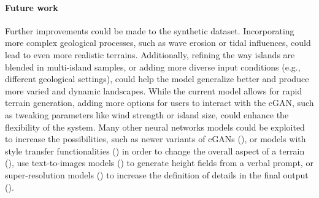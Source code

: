 \paragraph{Future work}
Further improvements could be made to the synthetic dataset. Incorporating more complex geological processes, such as wave erosion or tidal influences, could lead to even more realistic terrains. Additionally, refining the way islands are blended in multi-island samples, or adding more diverse input conditions (e.g., different geological settings), could help the model generalize better and produce more varied and dynamic landscapes.  While the current model allows for rapid terrain generation, adding more options for users to interact with the cGAN, such as tweaking parameters like wind strength or island size, could enhance the flexibility of the system. 
Many other neural networks models could be exploited to increase the possibilities, such as newer variants of cGANs (\cite{Park2019}), or models with style transfer functionalities (\cite{Gatys2015,Zhu2020}) in order to change the overall aspect of a terrain (\cite{Perche2023a,Perche2023b}), use text-to-images models (\cite{Rombach2021,Radford2021}) to generate height fields from a verbal prompt, or super-resolution models (\cite{Dong2014}) to increase the definition of details in the final output (\cite{Guerin2016a}).








